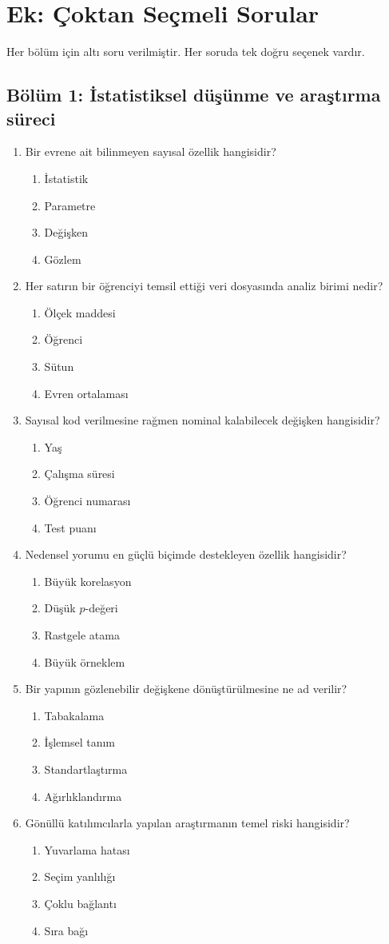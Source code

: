 \chapter*{Ek: Çoktan Seçmeli Sorular}

Her bölüm için altı soru verilmiştir. Her soruda tek doğru seçenek vardır.

\newcommand{\coksoru}[5]{\item #1
  \begin{enumerate}
  \renewcommand{\labelenumii}{\textbf{\Alph{enumii})}}
    \item #2 \item #3 \item #4 \item #5
  \end{enumerate}}

\section*{Bölüm 1: İstatistiksel düşünme ve araştırma süreci}
\begin{enumerate}\renewcommand{\labelenumi}{B1.\arabic{enumi}.}
\coksoru{Bir evrene ait bilinmeyen sayısal özellik hangisidir?}{İstatistik}{Parametre}{Değişken}{Gözlem}
\coksoru{Her satırın bir öğrenciyi temsil ettiği veri dosyasında analiz birimi nedir?}{Ölçek maddesi}{Öğrenci}{Sütun}{Evren ortalaması}
\coksoru{Sayısal kod verilmesine rağmen nominal kalabilecek değişken hangisidir?}{Yaş}{Çalışma süresi}{Öğrenci numarası}{Test puanı}
\coksoru{Nedensel yorumu en güçlü biçimde destekleyen özellik hangisidir?}{Büyük korelasyon}{Düşük $p$-değeri}{Rastgele atama}{Büyük örneklem}
\coksoru{Bir yapının gözlenebilir değişkene dönüştürülmesine ne ad verilir?}{Tabakalama}{İşlemsel tanım}{Standartlaştırma}{Ağırlıklandırma}
\coksoru{Gönüllü katılımcılarla yapılan araştırmanın temel riski hangisidir?}{Yuvarlama hatası}{Seçim yanlılığı}{Çoklu bağlantı}{Sıra bağı}
\end{enumerate}

